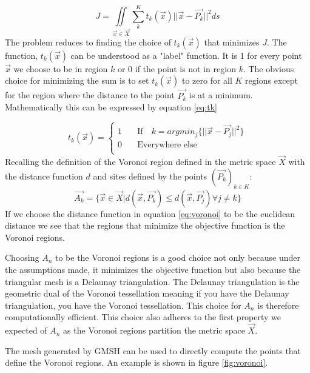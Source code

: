 \begin{equation}
    J = \iint \limits_{\Vec{x}\in\Vec{X}}\sum_{k}^{K}t_k(\Vec{x})||\Vec{x}- \Vec{P_k}||^2ds
    \label{eq:objFunc}
\end{equation}
The problem reduces to finding the choice of $t_k(\Vec{x})$ that minimizes $J$. The function, $t_k(\Vec{x})$ can be understood as a "label" function. It is 1 for every point $\Vec{x}$ we choose to be in region $k$ or 0 if the point is not in region $k$. The obvious choice for minimizing the sum is to set $t_k(\Vec{x})$ to zero for all $K$ regions except for the region where the distance to the point $\Vec{P_k}$ is at a minimum. Mathematically this can be expressed by equation \ref{eq:tk}

\begin{equation}
    t_k(\Vec{x}) = 
    \begin{cases}
        1 & \quad \text{If} \quad k = argmin_j\{||\Vec{x} - \Vec{P_j}||^2\}  \\
        0 & \quad \text{Everywhere else} \\
    \end{cases}
    \label{eq:tk}
\end{equation}
Recalling the definition of the Voronoi region defined in the metric space $\Vec{X}$ with the distance function $d$ and sites defined by the points $(\Vec{P_k})_{k \in K} $: 
\begin{equation}
    \Vec{A_k} = \{\Vec{x} \in \Vec{X}|d(\Vec{x},\Vec{P_k}) \leq d(\Vec{x},\Vec{P_j})\forall  j \neq k \}
    \label{eq:voronoi}
\end{equation}
If we choose the distance function in equation \ref{eq:voronoi} to be the euclidean distance we see that the regions that minimize the objective function is the Voronoi regions. \par
Choosing $A_n$ to be the Voronoi regions is a good choice not only because under the assumptions made, it minimizes the objective function but also because the triangular mesh is a Delaunay triangulation. The Delaunay triangulation is the geometric dual of the Voronoi tessellation meaning if you have the Delaunay triangulation, you have the Voronoi tessellation. This choice for $A_n$ is therefore computationally efficient. This choice also adheres to the first property we expected of $A_n$ as the Voronoi regions partition the metric space $\Vec{X}$. \par
The mesh generated by GMSH can be used to directly compute the points that define the Voronoi regions. An example is shown in figure \ref{fig:voronoi}. 

